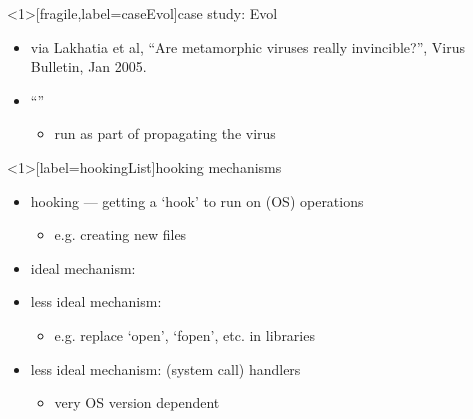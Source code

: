 \begin{frame}<1>[fragile,label=caseEvol]{case study: Evol}
    \begin{itemize}
    \item via Lakhatia et al, ``Are metamorphic viruses really invincible?'', Virus Bulletin, Jan 2005.
    \item ``''
        \begin{itemize}
        \item run as part of propagating the virus
        \end{itemize}
    \end{itemize}
\end{frame}

\begin{frame}<1>[label=hookingList]{hooking mechanisms}
    \begin{itemize}
    \item hooking --- getting a `hook' to run on (OS) operations
        \begin{itemize}
        \item e.g. creating new files
        \end{itemize}
    \item ideal mechanism: 
    \item less ideal mechanism: 
        \begin{itemize}
        \item e.g. replace `open', `fopen', etc. in libraries
        \end{itemize}
    \item less ideal mechanism:  (system call) handlers
        \begin{itemize}
        \item very OS version dependent
        \end{itemize} 
    \end{itemize}
\end{frame}


